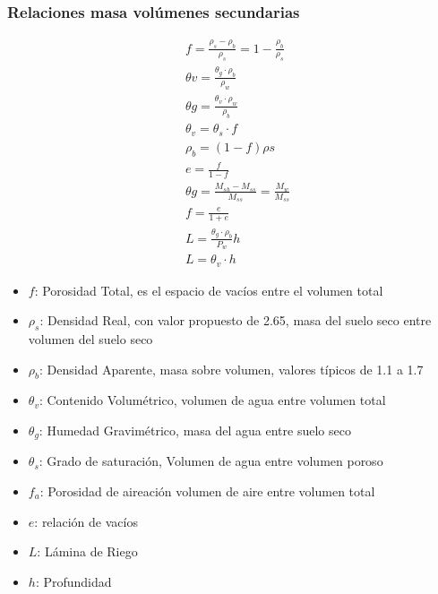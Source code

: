 \subsubsection{Relaciones masa volúmenes secundarias}
\begin{align}
    &f =\frac{\rho_s - \rho_b}{\rho_s} = 1 -\frac{\rho_b}{\rho_s}\\
    &\theta v =\frac{\theta_g \cdot \rho_b}{\rho_w}\\
    &\theta g =\frac{\theta_v \cdot \rho_w}{\rho_b}\\
    &\theta_v =\theta_s \cdot f\\
    &\rho_b =\left(1 - f\right)\rho s\\
    &e = \frac{f}{1 -f}\\
    &\theta g =\frac{M_{sh} -M_{ss}}{M_{ss}} = \frac{M_w}{M_{ss}}\\
    &f = \frac{e}{1 + e}\\
    &L = \frac{\theta_g \cdot \rho_b}{P_w}h\\
    &L =\theta_v \cdot h
\end{align}
\begin{notation}
    \begin{itemize}
        \item $f$: Porosidad Total, es el espacio de vacíos entre el volumen total
        \item $\rho_s$: Densidad Real, con valor propuesto de 2.65, masa del suelo seco entre volumen del suelo seco
        \item $\rho_b$: Densidad Aparente, masa sobre volumen, valores típicos de 1.1 a 1.7
        \item $\theta_v$: Contenido Volumétrico, volumen de agua entre volumen total
        \item $\theta_g$: Humedad Gravimétrico, masa del agua entre suelo seco
        \item $\theta_s$: Grado de saturación, Volumen de agua entre volumen poroso
        \item $f_a$: Porosidad de aireación volumen de aire entre volumen total
        \item $e$: relación de vacíos
        \item $L$: Lámina de Riego
        \item $h$: Profundidad
    \end{itemize}
\end{notation}
